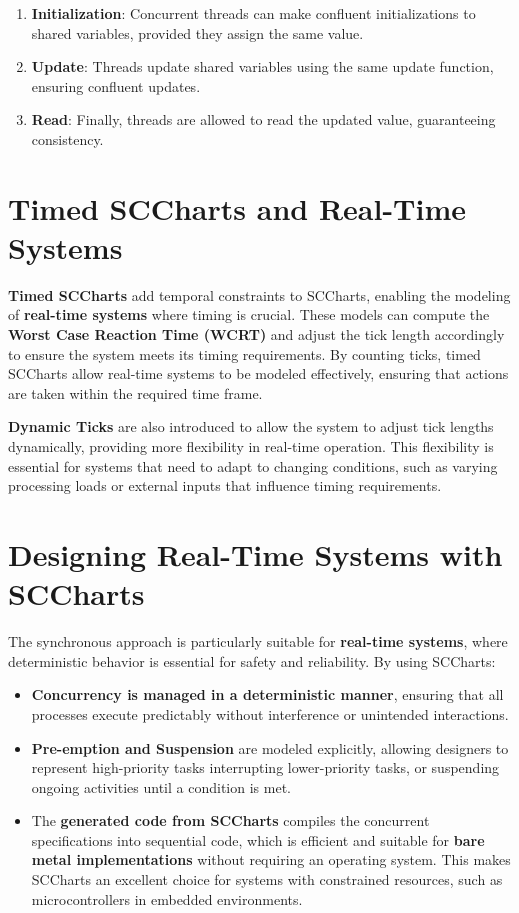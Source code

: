 \documentclass[
  14pt,
  a4paper,
  numbers=noendperiod,
  headinclude=true,
  footinclude=true,
  DIV=calc]{scrreprt}
\begin{document}
\begin{enumerate}
\def\labelenumi{\arabic{enumi}.}
\item
  \textbf{Initialization}: Concurrent threads can make confluent
  initializations to shared variables, provided they assign the same
  value.
\item
  \textbf{Update}: Threads update shared variables using the same update
  function, ensuring confluent updates.
\item
  \textbf{Read}: Finally, threads are allowed to read the updated value,
  guaranteeing consistency.
\end{enumerate}

\section{Timed SCCharts and Real-Time
Systems}\label{timed-sccharts-and-real-time-systems}

\textbf{Timed SCCharts} add temporal constraints to SCCharts, enabling
the modeling of \textbf{real-time systems} where timing is crucial.
These models can compute the \textbf{Worst Case Reaction Time (WCRT)}
and adjust the tick length accordingly to ensure the system meets its
timing requirements. By counting ticks, timed SCCharts allow real-time
systems to be modeled effectively, ensuring that actions are taken
within the required time frame.

\textbf{Dynamic Ticks} are also introduced to allow the system to adjust
tick lengths dynamically, providing more flexibility in real-time
operation. This flexibility is essential for systems that need to adapt
to changing conditions, such as varying processing loads or external
inputs that influence timing requirements.

\section{Designing Real-Time Systems with
SCCharts}\label{designing-real-time-systems-with-sccharts}

The synchronous approach is particularly suitable for \textbf{real-time
systems}, where deterministic behavior is essential for safety and
reliability. By using SCCharts:

\begin{itemize}
\item
  \textbf{Concurrency is managed in a deterministic manner}, ensuring
  that all processes execute predictably without interference or
  unintended interactions.
\item
  \textbf{Pre-emption and Suspension} are modeled explicitly, allowing
  designers to represent high-priority tasks interrupting lower-priority
  tasks, or suspending ongoing activities until a condition is met.
\item
  The \textbf{generated code from SCCharts} compiles the concurrent
  specifications into sequential code, which is efficient and suitable
  for \textbf{bare metal implementations} without requiring an operating
  system. This makes SCCharts an excellent choice for systems with
  constrained resources, such as microcontrollers in embedded
  environments.
\end{itemize}
\end{document}
